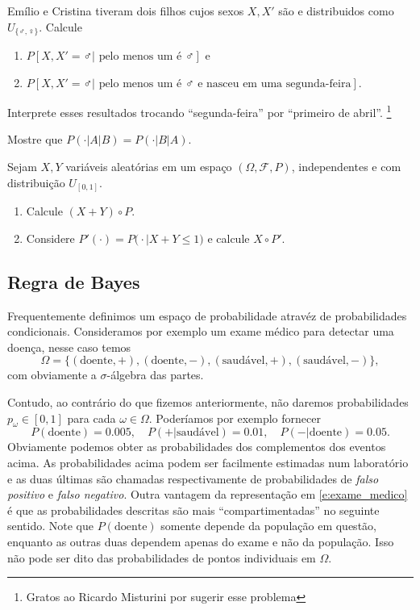 \begin{exercise}
  Emílio e Cristina tiveram dois filhos cujos sexos $X, X'$ são \iid e distribuidos como $U_{\{\male, \female\}}$.
  Calcule
  \begin{enumerate}[\quad a)]
  \item $P[X, X' = \male | \text{ pelo menos um é $\male$}]$ e
  \item $P[X, X' = \male | \text{ pelo menos um é $\male$ e nasceu em uma segunda-feira}]$.
  \end{enumerate}
  Interprete esses resultados trocando ``segunda-feira'' por ``primeiro de abril''.
  \footnote{Gratos ao Ricardo Misturini por sugerir esse problema}
\end{exercise}

\begin{exercise}
  Mostre que $P(\cdot|A|B) = P(\cdot|B|A)$.
\end{exercise}

\begin{exercise}
  Sejam $X, Y$ vari\'aveis aleat\'orias em um espaço $(\Omega, \mathcal{F}, P)$, independentes e com distribuição $U_{[0,1]}$.
  \begin{enumerate}[\quad a)]
  \item Calcule $(X+Y) \circ P$.
  \item Considere $P'(\cdot) = P\big(\cdot | X + Y \leq 1 \big)$ e calcule $X \circ P'$.
  \end{enumerate}
\end{exercise}

\subsection{Regra de Bayes}

Frequentemente definimos um espaço de probabilidade atravéz de probabilidades condicionais.
Consideramos por exemplo um exame médico para detectar uma doença, nesse caso temos
\begin{equation}
  \Omega = \{(\text{doente}, +), (\text{doente}, -), (\text{saudável}, +), (\text{saudável}, -)\},
\end{equation}
com obviamente a $\sigma$-álgebra das partes.

Contudo, ao contrário do que fizemos anteriormente, não daremos probabilidades $p_\omega \in [0,1]$ para cada $\omega \in \Omega$.
Poderíamos por exemplo fornecer
\begin{equation}
  \label{e:exame_medico}
  P(\text{doente}) = 0.005, \quad P( + | \text{saudável}) = 0.01, \quad P( - | \text{doente}) = 0.05.
\end{equation}
Obviamente podemos obter as probabilidades dos complementos dos eventos acima.
As probabilidades acima podem ser facilmente estimadas num laboratório e as duas últimas são chamadas respectivamente de probabilidades de \emph{falso positivo} e \emph{falso negativo}.
Outra vantagem da representação em \eqref{e:exame_medico} é que as probabilidades descritas são mais ``compartimentadas'' no seguinte sentido.
Note que $P(\text{doente})$ somente depende da população em questão, enquanto as outras duas dependem apenas do exame e não da população.
Isso não pode ser dito das probabilidades de pontos individuais em $\Omega$.

